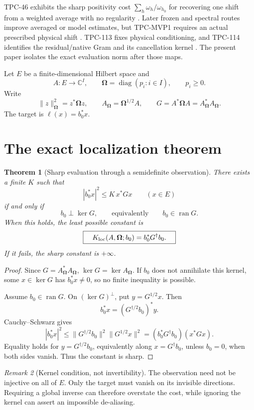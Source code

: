 \documentclass[11pt]{article}
\newtheorem{theorem}{Theorem}[section]
\theoremstyle{definition}
\theoremstyle{remark}
\newtheorem{remark}[theorem]{Remark}
\newcommand{\C}{\mathbb C}
\newcommand{\Om}{\boldsymbol\Omega}
\begin{document}
TPC-46 exhibits the sharp positivity cost
\(\sum_h\omega_h/\omega_{h_0}\) for recovering one shift from a
weighted average with no regularity \citep{WangTPC46}.  Later frozen
and spectral routes improve averaged or model estimates, but
TPC-MVP1 requires an actual prescribed physical shift
\citep{WangMVP1}.  TPC-113 fixes physical conditioning, and TPC-114
identifies the residual/native Gram and its cancellation kernel
\citep{WangTPC113,WangTPC114}.  The present paper isolates the exact
evaluation norm after those maps.

Let \(E\) be a finite-dimensional Hilbert space and
\[
 A:E\to\C^I,\qquad
 \Om=\operatorname{diag}(p_i:i\in I),\qquad p_i\ge0.
\]
Write
\[
 \|z\|_{\Om}^2=z^*\Om z,\qquad
 A_{\Om}=\Om^{1/2}A,\qquad G=A^*\Om A=A_{\Om}^*A_{\Om}.
\]
The target is \(\ell(x)=b_0^*x\).

\section{The exact localization theorem}

\begin{theorem}[Sharp evaluation through a semidefinite observation]
\label{thm:sharp}
There exists a finite \(K\) such that
\[
 |b_0^*x|^2\le K\,x^*Gx\qquad(x\in E)
\]
if and only if
\[
 b_0\perp\ker G,
 \qquad\text{equivalently}\qquad
 b_0\in\operatorname{ran}G.
\]
When this holds, the least possible constant is
\[
 \boxed{\quad K_{\rm loc}(A,\Om;b_0)
 =b_0^*G^\dagger b_0.\quad}
\]
If it fails, the sharp constant is \(+\infty\).
\end{theorem}

\begin{proof}
Since \(G=A_{\Om}^*A_{\Om}\),
\(\ker G=\ker A_{\Om}\).  If \(b_0\) does not annihilate this kernel,
some \(x\in\ker G\) has \(b_0^*x\ne0\), so no finite inequality is
possible.

Assume \(b_0\in\operatorname{ran}G\).  On
\((\ker G)^\perp\), put \(y=G^{1/2}x\).  Then
\[
 b_0^*x=(G^{\dagger/2}b_0)^*y.
\]
Cauchy--Schwarz gives
\[
 |b_0^*x|^2
 \le\|G^{\dagger/2}b_0\|^2\|G^{1/2}x\|^2
 =(b_0^*G^\dagger b_0)(x^*Gx).
\]
Equality holds for
\(y=G^{\dagger/2}b_0\), equivalently along
\(x=G^\dagger b_0\), unless \(b_0=0\), when both sides vanish.
Thus the constant is sharp.
\end{proof}

\begin{remark}[Kernel condition, not invertibility]
The observation need not be injective on all of \(E\).  Only the
target must vanish on its invisible directions.  Requiring a global
inverse can therefore overstate the cost, while ignoring the kernel
can assert an impossible de-aliasing.
\end{remark}
\end{document}
